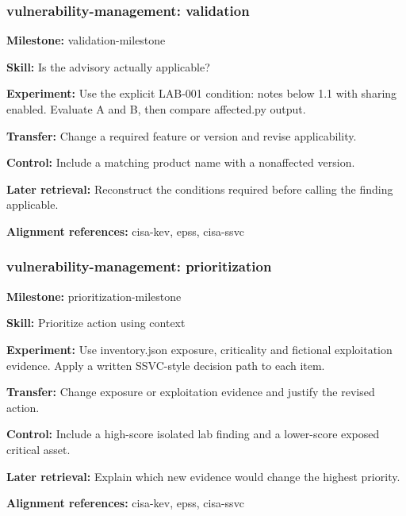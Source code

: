 \subsubsection{vulnerability-management: validation}
\noindent\textbf{Milestone:} validation-milestone\par
\noindent\textbf{Skill:} Is the advisory actually applicable?\par
\noindent\textbf{Experiment:} Use the explicit LAB-001 condition: notes below 1.1 with sharing enabled. Evaluate A and B, then compare affected.py output.\par
\noindent\textbf{Transfer:} Change a required feature or version and revise applicability.\par
\noindent\textbf{Control:} Include a matching product name with a nonaffected version.\par
\noindent\textbf{Later retrieval:} Reconstruct the conditions required before calling the finding applicable.\par
\noindent\textbf{Alignment references:} cisa-kev, epss, cisa-ssvc\par
\subsubsection{vulnerability-management: prioritization}
\noindent\textbf{Milestone:} prioritization-milestone\par
\noindent\textbf{Skill:} Prioritize action using context\par
\noindent\textbf{Experiment:} Use inventory.json exposure, criticality and fictional exploitation evidence. Apply a written SSVC-style decision path to each item.\par
\noindent\textbf{Transfer:} Change exposure or exploitation evidence and justify the revised action.\par
\noindent\textbf{Control:} Include a high-score isolated lab finding and a lower-score exposed critical asset.\par
\noindent\textbf{Later retrieval:} Explain which new evidence would change the highest priority.\par
\noindent\textbf{Alignment references:} cisa-kev, epss, cisa-ssvc\par
